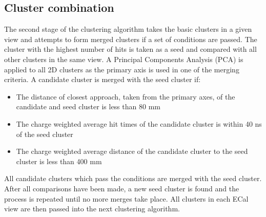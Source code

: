 \subsection{Cluster combination}
\label{subsec:ECalCombineClusters}
The second stage of the clustering algorithm takes the basic clusters in a given view and attempts to form merged clusters if a set of conditions are passed.  The cluster with the highest number of hits is taken as a seed and compared with all other clusters in the same view.  A Principal Components Analysis (PCA) is applied to all 2D clusters as the primary axis is used in one of the merging criteria.  A candidate cluster is merged with the seed cluster if:
\begin{itemize}
  \item The distance of closest approach, taken from the primary axes, of the candidate and seed cluster is less than 80 mm
  \item The charge weighted average hit times of the candidate cluster is within 40 ns of the seed cluster
  \item The charge weighted average distance of the candidate cluster to the seed cluster is less than 400 mm
\end{itemize}
All candidate clusters which pass the conditions are merged with the seed cluster.  After all comparisons have been made, a new seed cluster is found and the process is repeated until no more merges take place.  All clusters in each ECal view are then passed into the next clustering algorithm.



